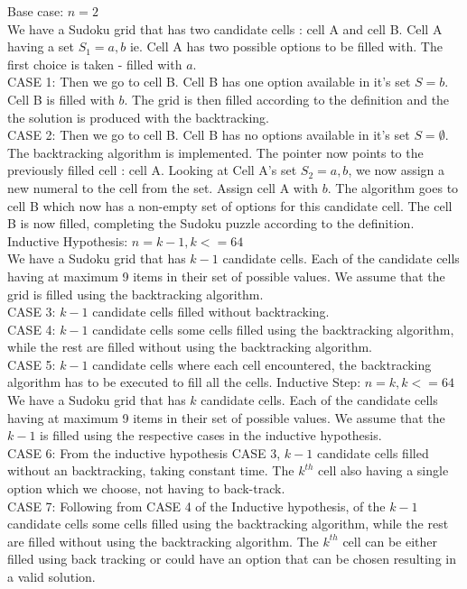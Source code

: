 \documentclass[12pt]{article}
\begin{document}
\begin{flushleft}
Base case: $n = 2$\\
We have a Sudoku grid that has two candidate cells : cell A and cell B. Cell A having a set $S_1 = {a,b}$ ie. Cell A has two possible options to be filled with. The first choice is taken - filled with $a$. \\
CASE 1: Then we go to cell B. Cell B has one option available in it's set $S = {b}$. Cell B is filled with $b$. The grid is then filled according to the definition and the the solution is produced with the backtracking.  \\
CASE 2: Then we go to cell B. Cell B has no options available in it's set $S = {\emptyset}$. The backtracking algorithm is implemented. The pointer now points to the previously filled cell : cell A. Looking at Cell A's set $S_2 = {a,b}$, we now assign a new numeral to the cell from the set. Assign cell A with $b$. The algorithm goes to cell B which now has a non-empty set of options for this candidate cell. The cell B is now filled, completing the Sudoku puzzle according to the definition. 
\newline
Inductive Hypothesis: $n = k-1, k<=64$\\
We have a Sudoku grid that has $k-1$ candidate cells. Each of the candidate cells having at maximum 9 items in their set of possible values. We assume that the grid is filled using the backtracking algorithm. \\
CASE 3: $k-1$ candidate cells filled without backtracking. \\
CASE 4: $k-1$ candidate cells some cells filled using the backtracking algorithm, while the rest are filled without using the backtracking algorithm. \\
CASE 5: $k-1$ candidate cells where each cell encountered, the backtracking algorithm has to be executed to fill all the cells. 
\newline
Inductive Step: $n = k, k<=64$\\
We have a Sudoku grid that has $k$ candidate cells. Each of the candidate cells having at maximum 9 items in their set of possible values. We assume that the $k-1$ is filled using the respective cases in the inductive hypothesis. \\
CASE 6: From the inductive hypothesis CASE 3, $k-1$ candidate cells filled without an backtracking, taking constant time. The $k^{th}$ cell also having a single option which we choose, not having to back-track.  \\
CASE 7: Following from CASE 4 of the Inductive hypothesis, of the $k-1$ candidate cells some cells filled using the backtracking algorithm, while the rest are filled without using the backtracking algorithm. The $k^{th}$ cell can be either filled using back tracking or could have an option that can be chosen resulting in a valid solution. \\

\end{flushleft}
\end{document}
